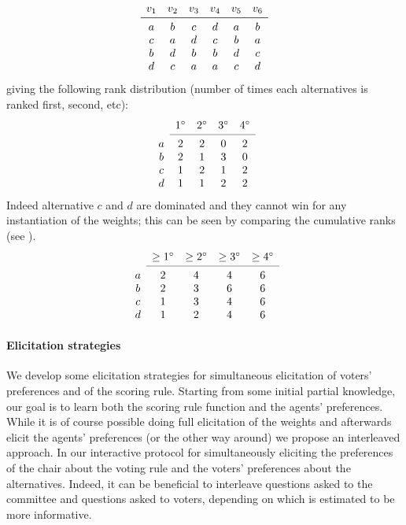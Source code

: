 \begin{example}
\[
\begin{array}{cccccc}
v_1& v_2& v_3 & v_4& v_5& v_6 \\
\midrule 
a& b& c & d& a& b \\
c& a& d& c& b& a \\
b& d& b& b& d& c \\
d& c& a& a& c& d \\
\end{array}
\]
giving the following rank distribution (number of times each alternatives is ranked first, second, etc): 
\[
\begin{array}{ccccc}
& 1^\circ& 2^\circ& 3^\circ& 4^\circ \\
\cmidrule{2-5}
a & 2& 2& 0& 2 \\
b& 2& 1& 3& 0 \\
c& 1& 2& 1& 2 \\
d& 1& 1& 2& 2 \\
\end{array}
\]
Indeed alternative $c$ and $d$ are dominated and they cannot win for any instantiation of the weights; this can be seen by comparing the cumulative ranks (see  \citep{Stein1994}).
\[
\begin{array}{ccccc}
& \geq 1^\circ
& \geq 2^\circ
& \geq 3^\circ
& \geq 4^\circ \\
\cmidrule{2-5}
a & 2 & 4& 4& 6 \\
b & 2 & 3& 6& 6 \\
c& 1& 3& 4& 6 \\
d& 1& 2& 4& 6 \\
\end{array}
\]
\end{example}



\paragraph{Elicitation strategies}

We develop some elicitation strategies for simultaneous elicitation of voters' preferences and of the scoring rule.
Starting from some initial partial knowledge, our goal is to learn both the scoring rule function and the agents' preferences.
While it is of course possible doing full elicitation of the weights and afterwards elicit the agents' preferences (or the other way around) we propose an interleaved approach.
In our interactive  protocol for simultaneously eliciting the preferences of the chair about the voting rule and the voters' preferences about the alternatives.
Indeed, it can be beneficial to interleave questions asked to the committee and questions asked to voters, depending on which is estimated to be more informative.

